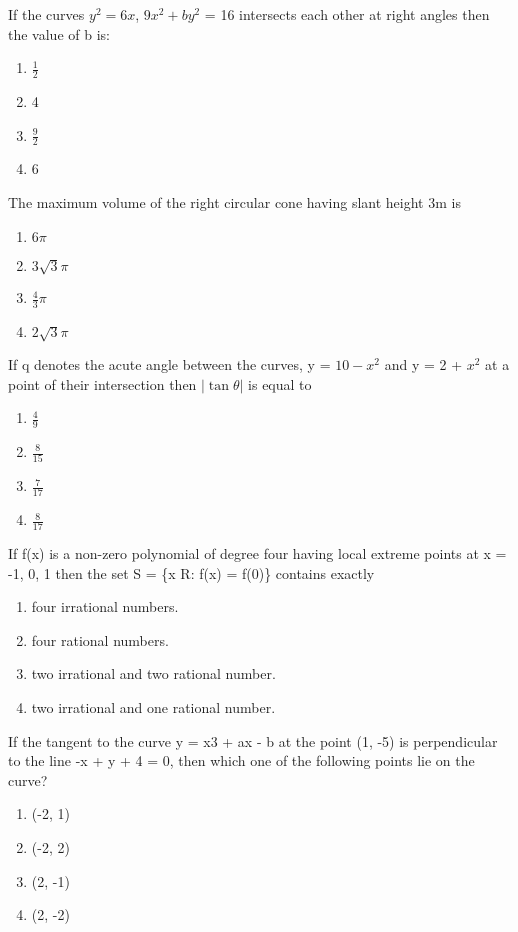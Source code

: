 \item If the curves $y^2 = 6x$, $9x^2 + by^2$ = 16 intersects each other at right angles then the value of b is:
\begin{enumerate}
\item $\frac{1}{2}$
\item 4
\item $\frac{9}{2}$
\item 6
\end{enumerate}

\item The maximum volume of the right circular cone having slant height 3m is
\begin{enumerate}
\item $6\pi$
\item $3\sqrt{3}\pi$
\item $\frac{4}{3}\pi$
\item $2\sqrt{3}\pi$
\end{enumerate}

\item If q denotes the acute angle between the curves, y = $10 - x^2$ and y = 2 + $x^2$ at a point of their intersection then $|\tan \theta|$ is equal to 
\begin{enumerate}
\item $\frac{4}{9}$
\item $\frac{8}{15}$
\item $\frac{7}{17}$
\item $\frac{8}{17}$
\end{enumerate}

\item If f(x) is a non-zero polynomial of degree four having local extreme points at x = -1, 0, 1 then the set 
S = \{x R: f(x) = f(0)\} contains exactly
\begin{enumerate}
\item four irrational numbers.
\item four rational numbers. 
\item two irrational and two rational number.
\item two irrational and one rational number.
\end{enumerate}

\item If the tangent to the curve y = x3 + ax - b at the point (1, -5) is perpendicular to the line -x + y + 4 = 0, then which one of the following points lie on the curve?
\begin{enumerate}
\item (-2, 1)
\item (-2, 2)
\item (2, -1)
\item (2, -2)
\end{enumerate}

